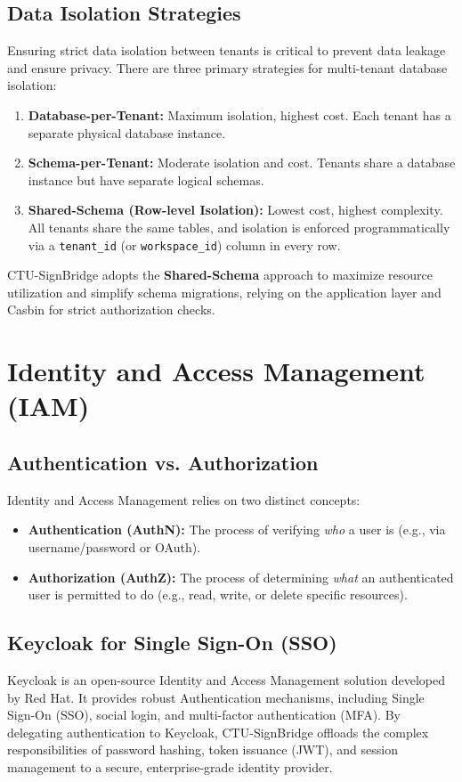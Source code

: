 \subsection{Data Isolation Strategies}
Ensuring strict data isolation between tenants is critical to prevent data leakage and ensure privacy. There are three primary strategies for multi-tenant database isolation:
\begin{enumerate}
    \item \textbf{Database-per-Tenant:} Maximum isolation, highest cost. Each tenant has a separate physical database instance.
    \item \textbf{Schema-per-Tenant:} Moderate isolation and cost. Tenants share a database instance but have separate logical schemas.
    \item \textbf{Shared-Schema (Row-level Isolation):} Lowest cost, highest complexity. All tenants share the same tables, and isolation is enforced programmatically via a \texttt{tenant\_id} (or \texttt{workspace\_id}) column in every row.
\end{enumerate}
CTU-SignBridge adopts the \textbf{Shared-Schema} approach to maximize resource utilization and simplify schema migrations, relying on the application layer and Casbin for strict authorization checks.

\section{Identity and Access Management (IAM)}
\subsection{Authentication vs. Authorization}
Identity and Access Management relies on two distinct concepts:
\begin{itemize}
    \item \textbf{Authentication (AuthN):} The process of verifying \textit{who} a user is (e.g., via username/password or OAuth).
    \item \textbf{Authorization (AuthZ):} The process of determining \textit{what} an authenticated user is permitted to do (e.g., read, write, or delete specific resources).
\end{itemize}

\subsection{Keycloak for Single Sign-On (SSO)}
Keycloak \cite{keycloak2024} is an open-source Identity and Access Management solution developed by Red Hat. It provides robust Authentication mechanisms, including Single Sign-On (SSO), social login, and multi-factor authentication (MFA). By delegating authentication to Keycloak, CTU-SignBridge offloads the complex responsibilities of password hashing, token issuance (JWT), and session management to a secure, enterprise-grade identity provider.

